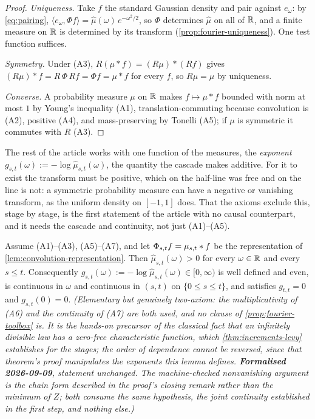 \begin{proof}
\emph{Uniqueness.} Take $f$ the standard Gaussian density and pair against $e_\omega$: by
\ref{eq:pairing}, $\langle e_\omega, \Phi f\rangle = \hat\mu(\omega)\,e^{-\omega^2/2}$, so
$\Phi$ determines $\hat\mu$ on all of $\mathbb{R}$, and a finite measure on $\mathbb{R}$ is determined by its
transform (\ref{prop:fourier-uniqueness}). One test function suffices.

\emph{Symmetry.} Under (A3), $R(\mu * f) = (R\mu) * (Rf)$ gives
$(R\mu) * f = R\,\Phi\,R f = \Phi f = \mu * f$ for every $f$, so $R\mu = \mu$ by uniqueness.

\emph{Converse.} A probability measure $\mu$ on $\mathbb{R}$ makes $f \mapsto \mu * f$ bounded with
norm at most $1$ by Young's inequality (A1), translation-commuting because convolution is
(A2), positive (A4), and mass-preserving by Tonelli (A5); if $\mu$ is symmetric it commutes
with $R$ (A3).
\end{proof}

The rest of the article works with one function of the measures, the \emph{exponent}
$g_{s,t}(\omega) := -\log\hat\mu_{s,t}(\omega)$, the quantity the cascade makes additive. For
it to exist the transform must be positive, which on the half-line was free and on the line is
not: a symmetric probability measure can have a negative or vanishing transform, as the uniform
density on $[-1,1]$ does. That the axioms exclude this, stage by stage, is the first statement
of the article with no causal counterpart, and it needs the cascade and continuity, not just
(A1)--(A5).

\begin{lemma}\label{lem:nonvanishing}
\leanok
{}
Assume (A1)--(A3), (A5)--(A7), and let $\Phi_{s,t}f = \mu_{s,t} * f$ be the representation of
\ref{lem:convolution-representation}. Then $\hat\mu_{s,t}(\omega) > 0$ for every
$\omega \in \mathbb{R}$ and every $s \le t$. Consequently
$g_{s,t}(\omega) := -\log\hat\mu_{s,t}(\omega) \in [0,\infty)$ is well defined and even, is
continuous in $\omega$ and continuous in $(s,t)$ on $\{0 \le s \le t\}$, and satisfies
$g_{t,t} = 0$ and $g_{s,t}(0) = 0$.
\statusT\quad\emph{(Elementary but genuinely two-axiom: the multiplicativity of (A6) and the
continuity of (A7) are both used, and no clause of \ref{prop:fourier-toolbox} is. It is the
hands-on precursor of the classical fact that an infinitely divisible law has a zero-free
characteristic function, which \ref{thm:increments-levy} establishes for the stages; the order
of dependence cannot be reversed, since that theorem's proof manipulates the exponents this
lemma defines. \textbf{Formalised 2026-09-09}, statement unchanged. The machine-checked
nonvanishing argument is the chain form described in the proof's closing remark rather than the
minimum of $Z$; both consume the same hypothesis, the joint continuity established in the first
step, and nothing else.)}
\end{lemma}

